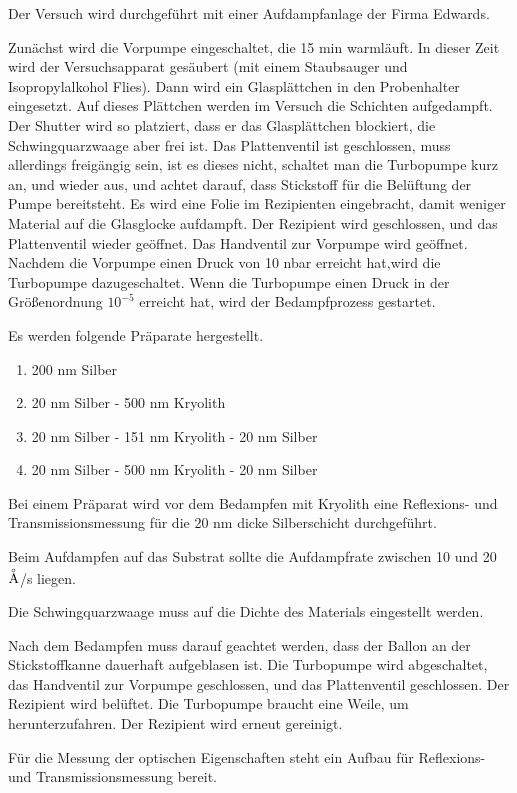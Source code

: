 \documentclass[10pt,twoside]{article}
\renewcommand{\1}{^{-1}}
\renewcommand{\2}{^{-2}}
\newcommand{\3}{^{-3}}
\newcommand{\4}{^{-4}}
\newcommand{\5}{^{-5}}
\newcommand{\6}{^{-6}}
\newcommand{\7}{^{-7}}
\newcommand{\8}{^{-8}}
\newcommand{\9}{^{-9}}
\begin{document}
Der Versuch wird durchgeführt mit einer Aufdampfanlage der Firma Edwards.

Zunächst wird die Vorpumpe eingeschaltet, die 15 min warmläuft. 
In dieser Zeit wird der Versuchsapparat gesäubert 
(mit einem Staubsauger und Isopropylalkohol Flies).
Dann wird ein Glasplättchen in den Probenhalter eingesetzt. Auf dieses Plättchen werden im Versuch die Schichten aufgedampft. Der Shutter wird so platziert, dass er das Glasplättchen blockiert, die Schwingquarzwaage aber frei ist.
Das Plattenventil ist geschlossen, muss allerdings freigängig sein, ist es dieses nicht, schaltet man die Turbopumpe kurz an, und wieder aus, und achtet darauf, dass Stickstoff für die Belüftung der Pumpe bereitsteht.
Es wird eine Folie im Rezipienten eingebracht, damit weniger Material auf die Glasglocke aufdampft. Der Rezipient wird geschlossen, und das Plattenventil wieder geöffnet. Das Handventil zur Vorpumpe wird geöffnet. Nachdem die Vorpumpe einen Druck von 10 nbar erreicht hat,wird die Turbopumpe dazugeschaltet. Wenn die Turbopumpe einen Druck in der Größenordnung $10^{-5}$ erreicht hat, wird der Bedampfprozess gestartet.

Es werden folgende Präparate hergestellt.
\begin{enumerate}[itemsep=0pt] 
\item 200 nm Silber
\item 20 nm Silber - 500 nm Kryolith
\item 20 nm Silber - 151 nm Kryolith - 20 nm Silber
\item 20 nm Silber - 500 nm Kryolith - 20 nm Silber
\end{enumerate}
Bei einem Präparat wird vor dem Bedampfen mit Kryolith eine Reflexions- und Transmissionsmessung für die 20 nm dicke Silberschicht durchgeführt.

Beim Aufdampfen auf das Substrat sollte die Aufdampfrate zwischen 10 und 20 $\buildrel _{\circ} \over {\mathrm{A}}$/s liegen.

Die Schwingquarzwaage muss auf die Dichte des Materials eingestellt werden.

Nach dem Bedampfen muss darauf geachtet werden, dass der Ballon an der Stickstoffkanne dauerhaft aufgeblasen ist. Die Turbopumpe wird abgeschaltet, das Handventil zur Vorpumpe geschlossen, und das Plattenventil geschlossen. Der Rezipient wird belüftet.
Die Turbopumpe braucht eine Weile, um herunterzufahren.
Der Rezipient wird erneut gereinigt.

Für die Messung der optischen Eigenschaften steht ein Aufbau für Reflexions- und Transmissionsmessung bereit.
\end{document}
